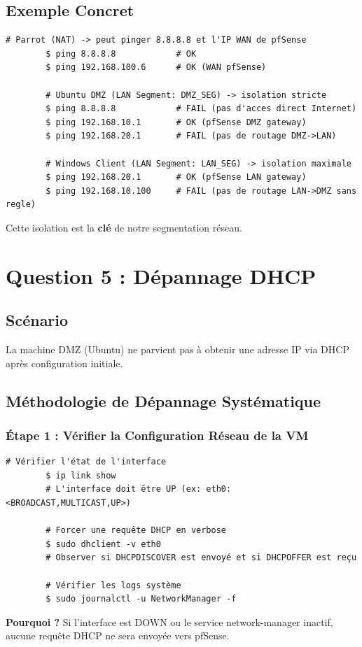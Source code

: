 \documentclass[12pt,a4paper,openany]{report}
\begin{document}
	\subsection{Exemple Concret}
	\begin{lstlisting}[caption=Isolation Réseau Vérifiée]
		# Parrot (NAT) -> peut pinger 8.8.8.8 et l'IP WAN de pfSense
		$ ping 8.8.8.8            # OK
		$ ping 192.168.100.6      # OK (WAN pfSense)
		
		# Ubuntu DMZ (LAN Segment: DMZ_SEG) -> isolation stricte
		$ ping 8.8.8.8            # FAIL (pas d'acces direct Internet)
		$ ping 192.168.10.1       # OK (pfSense DMZ gateway)
		$ ping 192.168.20.1       # FAIL (pas de routage DMZ->LAN)
		
		# Windows Client (LAN Segment: LAN_SEG) -> isolation maximale
		$ ping 192.168.20.1       # OK (pfSense LAN gateway)
		$ ping 192.168.10.100     # FAIL (pas de routage LAN->DMZ sans regle)
	\end{lstlisting}
	
	Cette isolation est la \textbf{clé} de notre segmentation réseau.
	
	\section{Question 5 : Dépannage DHCP}
	
	\subsection{Scénario}
	La machine DMZ (Ubuntu) ne parvient pas à obtenir une adresse IP via DHCP après configuration initiale.
	
	\subsection{Méthodologie de Dépannage Systématique}
	
	\subsubsection{Étape 1 : Vérifier la Configuration Réseau de la VM}
	\begin{lstlisting}[caption=Diagnostic Réseau sur Ubuntu DMZ]
		# Vérifier l'état de l'interface
		$ ip link show
		# L'interface doit être UP (ex: eth0: <BROADCAST,MULTICAST,UP>)
		
		# Forcer une requête DHCP en verbose
		$ sudo dhclient -v eth0
		# Observer si DHCPDISCOVER est envoyé et si DHCPOFFER est reçu
		
		# Vérifier les logs système
		$ sudo journalctl -u NetworkManager -f
	\end{lstlisting}
	\textbf{Pourquoi ?} Si l'interface est DOWN ou le service network-manager inactif, aucune requête DHCP ne sera envoyée vers pfSense.
	
\end{document}
